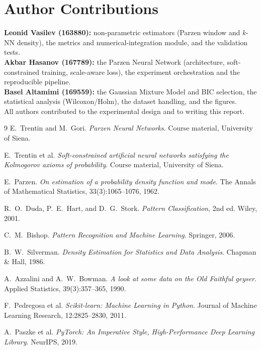 \documentclass[11pt,a4paper]{article}
\begin{document}
\section*{Author Contributions}
\noindent
\textbf{Leonid Vasilev (163880):} non-parametric estimators (Parzen window and
$k$-NN density), the metrics and numerical-integration module, and the
validation tests.\\
\textbf{Akbar Hasanov (167789):} the Parzen Neural Network (architecture,
soft-constrained training, scale-aware loss), the experiment orchestration and
the reproducible pipeline.\\
\textbf{Basel Altamimi (169559):} the Gaussian Mixture Model and BIC selection,
the statistical analysis (Wilcoxon/Holm), the dataset handling, and the figures.\\
All authors contributed to the experimental design and to writing this report.

\begin{thebibliography}{9}
E.~Trentin and M.~Gori.
\emph{Parzen Neural Networks}. Course material, University of Siena.

E.~Trentin et al.
\emph{Soft-constrained artificial neural networks satisfying the Kolmogorov
axioms of probability}. Course material, University of Siena.

E.~Parzen.
\emph{On estimation of a probability density function and mode}.
The Annals of Mathematical Statistics, 33(3):1065--1076, 1962.

R.~O.~Duda, P.~E.~Hart, and D.~G.~Stork.
\emph{Pattern Classification}, 2nd ed. Wiley, 2001.

C.~M.~Bishop.
\emph{Pattern Recognition and Machine Learning}. Springer, 2006.

B.~W.~Silverman.
\emph{Density Estimation for Statistics and Data Analysis}.
Chapman \& Hall, 1986.

A.~Azzalini and A.~W.~Bowman.
\emph{A look at some data on the Old Faithful geyser}.
Applied Statistics, 39(3):357--365, 1990.

F.~Pedregosa et al.
\emph{Scikit-learn: Machine Learning in Python}.
Journal of Machine Learning Research, 12:2825--2830, 2011.

A.~Paszke et al.
\emph{PyTorch: An Imperative Style, High-Performance Deep Learning Library}.
NeurIPS, 2019.
\end{thebibliography}
\end{document}
